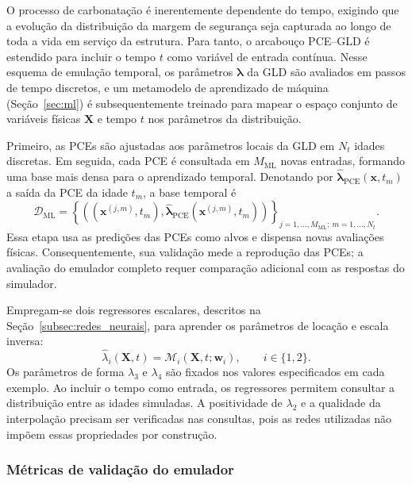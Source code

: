 O processo de carbonatação é inerentemente dependente do tempo, exigindo que a evolução da distribuição da margem de segurança seja capturada ao longo de toda a vida em serviço da estrutura. Para tanto, o arcabouço PCE--GLD é estendido para incluir o tempo $t$ como variável de entrada contínua. Nesse esquema de emulação temporal, os parâmetros $\boldsymbol{\lambda}$ da GLD são avaliados em passos de tempo discretos, e um metamodelo de aprendizado de máquina (Seção~\ref{sec:ml}) é subsequentemente treinado para mapear o espaço conjunto de variáveis físicas $\mathbf{X}$ e tempo $t$ nos parâmetros da distribuição.

Primeiro, as PCEs são ajustadas aos parâmetros locais da GLD em $N_t$ idades discretas. Em seguida, cada PCE é consultada em $M_{\mathrm{ML}}$ novas entradas, formando uma base mais densa para o aprendizado temporal. Denotando por $\hat{\boldsymbol{\lambda}}_{\mathrm{PCE}}(\mathbf{x},t_m)$ a saída da PCE da idade $t_m$, a base temporal é
\begin{equation}
\mathcal{D}_{\mathrm{ML}} = \left\{\left((\mathbf{x}^{(j,m)},t_m),\hat{\boldsymbol{\lambda}}_{\mathrm{PCE}}(\mathbf{x}^{(j,m)},t_m)\right)\right\}_{j=1,\ldots,M_{\mathrm{ML}};\ m=1,\ldots,N_t}.
\label{eq:dataset_temporal}
\end{equation}
Essa etapa usa as predições das PCEs como alvos e dispensa novas avaliações físicas. Consequentemente, sua validação mede a reprodução das PCEs; a avaliação do emulador completo requer comparação adicional com as respostas do simulador.

Empregam-se dois regressores escalares, descritos na Seção~\ref{subsec:redes_neurais}, para aprender os parâmetros de locação e escala inversa:
\begin{equation}
\hat{\lambda}_i(\mathbf{X},t)=\mathcal{M}_i(\mathbf{X},t;\mathbf{w}_i),\qquad i\in\{1,2\}.
\label{eq:ml_temporal}
\end{equation}
Os parâmetros de forma $\lambda_3$ e $\lambda_4$ são fixados nos valores especificados em cada exemplo. Ao incluir o tempo como entrada, os regressores permitem consultar a distribuição entre as idades simuladas. A positividade de $\lambda_2$ e a qualidade da interpolação precisam ser verificadas nas consultas, pois as redes utilizadas não impõem essas propriedades por construção.

\subsubsection{M\'etricas de valida\c{c}\~ao do emulador}
\label{subsec:metricas}

